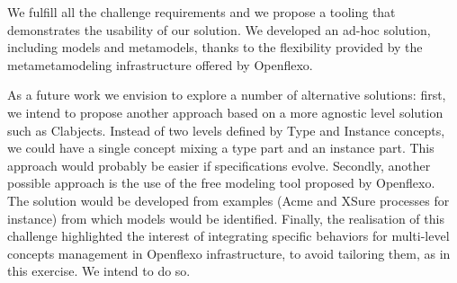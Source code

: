 

We fulfill all the challenge requirements and we propose a tooling that demonstrates the usability of our solution.  We developed an ad-hoc solution, including models and metamodels, thanks to the flexibility provided by the metametamodeling infrastructure offered by Openflexo.

As a future work we envision to explore a number of alternative solutions: first, we intend to propose another approach based on a more agnostic level solution such as Clabjects. Instead of two levels defined by Type and Instance concepts, we could have a single concept mixing a type part and an instance part. This approach would probably be easier if specifications evolve. Secondly, another possible approach is the use of the free modeling tool proposed by Openflexo. The solution would be developed from examples (Acme and XSure processes for instance) from which models would be identified. Finally, the realisation of this challenge highlighted the interest of integrating specific behaviors for multi-level concepts management in Openflexo infrastructure, to avoid tailoring them, as in this exercise. We intend to do so.